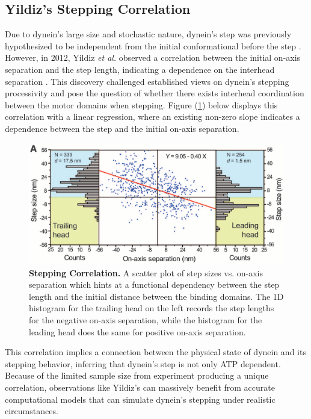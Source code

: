 \subsection{Yildiz's Stepping Correlation}

Due to dynein's large size and stochastic nature, dynein's step was previously hypothesized to be independent from the initial conformational before the step \cite{wang1995single}. However, in 2012, Yildiz \textit{et al.} observed a correlation between the initial on-axis separation and the step length, indicating a dependence on the interhead separation \cite{Dewitt2012}. This discovery challenged established views on dynein's stepping processivity and pose the question of whether there exists interhead coordination between the motor domains when stepping. Figure (\ref{fig:YildizCorrelation}) below displays this correlation with a linear regression, where an existing non-zero slope indicates a dependence between the step and the initial on-axis separation.

\begin{figure}[H]
	\centering
	\includegraphics[width=1\columnwidth]{Figures/Yildiz_stepping.png}
	\caption[Stepping Correlation]{\textbf{Stepping Correlation.} A scatter plot of step sizes vs. on-axis separation which hints at a functional dependency between the step  length and the initial distance between the binding domains. The 1D histogram for the trailing head on the left records the step lengths for the negative on-axis separation, while the histogram for the leading head does the same for positive on-axis separation. \cite{Dewitt2012} }
	\label{fig:YildizCorrelation}
\end{figure}

This correlation implies a connection between the physical state of dynein and its stepping behavior, inferring that dynein's step is not only ATP dependent. Because of the limited sample size from experiment producing a unique correlation, observations like Yildiz's can massively benefit from accurate computational models that can simulate dynein's stepping under realistic circumstances.




